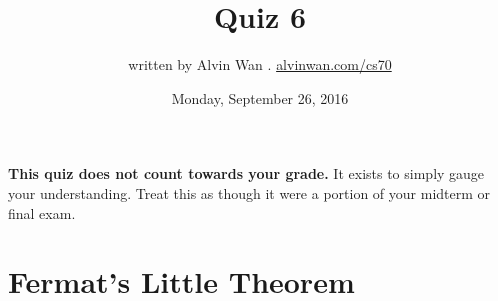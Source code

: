 \documentclass[a4paper]{article}
\title{Quiz 6 \green{Solutions}}
\author{written by Alvin Wan . \href{http://alvinwan.com/cs70}{alvinwan.com/cs70}}
\date{Monday, September 26, 2016}
\begin{document}
\newcommand{\green}[1]{\textcolor{nicegreen}{#1}}
\newcommand{\sol}[1]{{\color{nicegreen} \smallskip\textbf{Solution:} #1}}


\maketitle

\textbf{This quiz does not count towards your grade.} It exists to simply gauge your understanding. Treat this as though it were a portion of your midterm or final exam.

\section{Fermat's Little Theorem}
\end{document}
